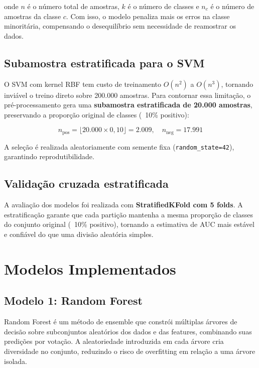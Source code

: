 \documentclass[a4paper,12pt]{article}
\begin{document}
onde $n$ é o número total de amostras, $k$ é o número de classes e $n_c$ é o número de amostras da classe $c$. Com isso, o modelo penaliza mais os erros na classe minoritária, compensando o desequilíbrio sem necessidade de reamostrar os dados.

\subsection{Subamostra estratificada para o SVM}

O SVM com kernel RBF tem custo de treinamento $O(n^2)$ a $O(n^3)$, tornando inviável o treino direto sobre 200.000 amostras. Para contornar essa limitação, o pré-processamento gera uma \textbf{subamostra estratificada de 20.000 amostras}, preservando a proporção original de classes (~10\% positivo):

\[
n_{\text{pos}} = \lfloor 20.000 \times 0{,}10 \rfloor = 2.009, \quad n_{\text{neg}} = 17.991
\]

A seleção é realizada aleatoriamente com semente fixa (\texttt{random\_state=42}), garantindo reprodutibilidade.

\subsection{Validação cruzada estratificada}

A avaliação dos modelos foi realizada com \textbf{StratifiedKFold com 5 folds}. A estratificação garante que cada partição mantenha a mesma proporção de classes do conjunto original (~10\% positivo), tornando a estimativa de AUC mais estável e confiável do que uma divisão aleatória simples.

\newpage

\section{Modelos Implementados}

\subsection{Modelo 1: Random Forest}

Random Forest é um método de ensemble que constrói múltiplas árvores de decisão sobre subconjuntos aleatórios dos dados e das features, combinando suas predições por votação. A aleatoriedade introduzida em cada árvore cria diversidade no conjunto, reduzindo o risco de overfitting em relação a uma árvore isolada.
\end{document}
